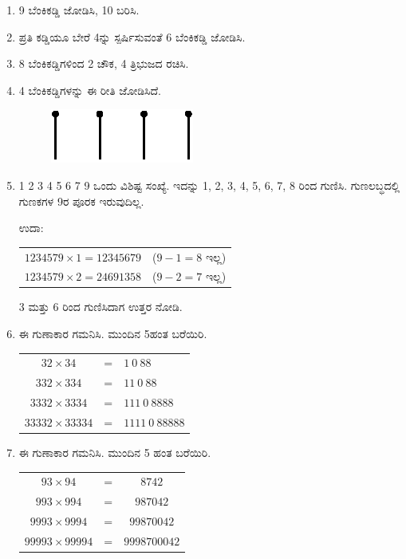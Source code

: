 \begin{enumerate}
\item 9 ಬೆಂಕಿಕಡ್ಡಿ ಜೋಡಿಸಿ, 10 ಬರಿಸಿ. 

\item ಪ್ರತಿ ಕಡ್ಡಿಯೂ ಬೇರೆ 4ನ್ನು ಸ್ಪರ್ಷಿಸುವಂತೆ 6 ಬೆಂಕಿಕಡ್ಡಿ ಜೋಡಿಸಿ. 

\item 8 ಬೆಂಕಿಕಡ್ಡಿಗಳಿಂದ 2 ಚೌಕ, 4 ತ್ರಿಭುಜದ ರಚಿಸಿ.

\item 4 ಬೆಂಕಿಕಡ್ಡಿಗಳನ್ನು ಈ ರೀತಿ ಜೋಡಿಸಿದೆ. 
\begin{figure}[H]
\centering
\includegraphics{images/chap12/q12.eps}

\qquad{}
\end{figure}

\item 1 2 3 4 5 6 7 9 ಒಂದು ವಿಶಿಷ್ಟ ಸಂಖ್ಯೆ. ಇದನ್ನು 1, 2, 3, 4, 5, 6, 7, 8 ರಿಂದ ಗುಣಿಸಿ. ಗುಣಲಬ್ಧದಲ್ಲಿ ಗುಣಕಗಳ 9ರ ಪೂರಕ ಇರುವುದಿಲ್ಲ. 

\vskip 0.2cm
ಉದಾ: 
\begin{tabular}[t]{ll}
$1234579\times 1 = 12345679$ & ($9 - 1 = 8$ ಇಲ್ಲ)\\
$1234579\times 2 = 24691358$ & ($9 - 2 = 7$ ಇಲ್ಲ)
\end{tabular}

\vskip 0.1cm
3 ಮತ್ತು 6 ರಿಂದ ಗುಣಿಸಿದಾಗ ಉತ್ತರ ನೋಡಿ. 

\item ಈ ಗುಣಾಕಾರ ಗಮನಿಸಿ. ಮುಂದಿನ 5ಹಂತ ಬರೆಯಿರಿ. 

\begin{tabular}[t]{c@{\;}c@{\;}l}
$32\times 34$ & = & $1~0~88$\\
$332\times 334$ & = & $11~0~88$\\
$3332\times 3334$ & = & $111~0~8888$\\
$33332\times 33334$ & = & $1111~0~88888$\\
\end{tabular}

\item ಈ ಗುಣಾಕಾರ ಗಮನಿಸಿ. ಮುಂದಿನ 5 ಹಂತ ಬರೆಯಿರಿ. 

{\fontsize{11pt}{13pt}\selectfont
\begin{tabular}[t]{c@{\;}c@{\;}c}
$93\times 94$ & = & $8742$\\
$993\times 994$ & = & $987042$\\
$9993\times 9994$ & = & $99870042$\\
$99993\times 99994$ & = & $9998700042$
\end{tabular}}\relax


\end{enumerate}
